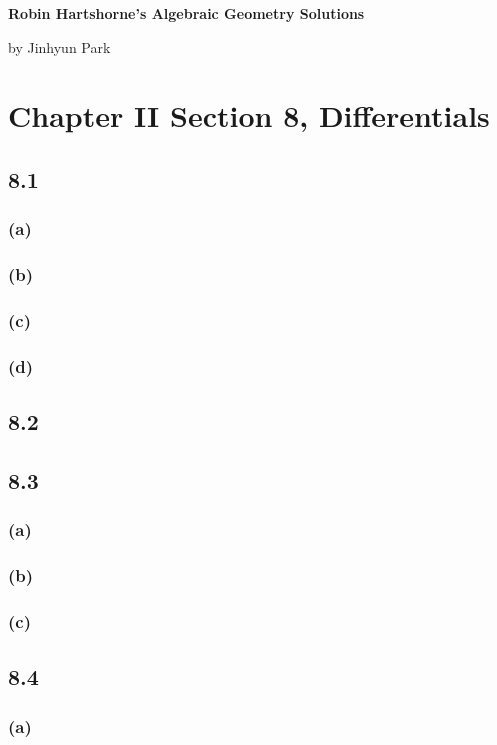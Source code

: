 \documentclass[11pt]{amsart}          %
\begin{document}
\begin{center}
\bf
\large Robin Hartshorne's Algebraic Geometry Solutions
\end{center}
\begin{center}
by Jinhyun Park
\end{center}
\vskip0.5cm

\section*{Chapter II Section 8, Differentials}

\subsection*{8.1}
\subsubsection*{(a)}
\subsubsection*{(b)}
\subsubsection*{(c)}
\subsubsection*{(d)}
\subsection*{8.2}
\subsection*{8.3}
\subsubsection*{(a)}
\subsubsection*{(b)}
\subsubsection*{(c)}
\subsection*{8.4}
\subsubsection*{(a)}
\end{document}
